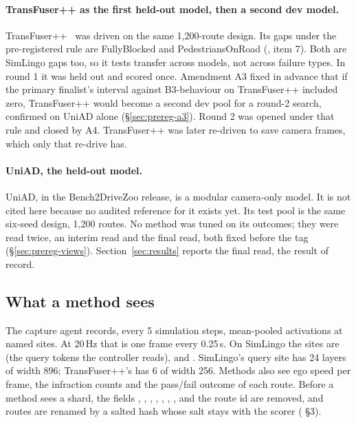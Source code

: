 \paragraph{TransFuser++ as the first held-out model, then a second dev model.}
TransFuser++~\cite{jaeger2023hidden,zimmerlin2024hidden} was driven on the same
1,200-route design.
Its gaps under the pre-registered rule are FullyBlocked and
PedestriansOnRoad (, item 7). Both are SimLingo gaps too,
so it tests transfer across models, not across failure types. In round 1 it was
held out and scored once. Amendment A3 fixed in advance that if the primary
finalist's interval against B3-behaviour on TransFuser++ included zero,
TransFuser++ would become a second dev pool for a round-2 search, confirmed on
UniAD alone (\S\ref{sec:prereg-a3}). Round 2 was opened under that rule and
closed by A4. TransFuser++ was later re-driven to save camera frames, which only
that re-drive has.

\paragraph{UniAD, the held-out model.}
UniAD, in the Bench2DriveZoo release, is a modular camera-only model. It is not
cited here because no audited reference for it exists yet.
Its test pool is the same six-seed design, 1,200 routes. No method was tuned on its
outcomes; they were read twice, an interim read and the final read, both fixed
before the tag (\S\ref{sec:prereg-views}). Section~\ref{sec:results} reports
the final read, the result of record.

\subsection{What a method sees}

The capture agent records, every 5 simulation steps, mean-pooled activations at
named sites.
At 20\,Hz that is one frame every 0.25\,s. On SimLingo the sites are
 (the query tokens the controller reads), 
and .
SimLingo's query site has 24 layers of width 896; TransFuser++'s has 6 of width
256. Methods also see ego speed per frame, the infraction counts and the
pass/fail outcome of each route. Before a method sees a shard, the fields
, , , ,
, , ,  and the route id are
removed, and routes are renamed by a salted hash whose salt stays with the
scorer ( \S3).
